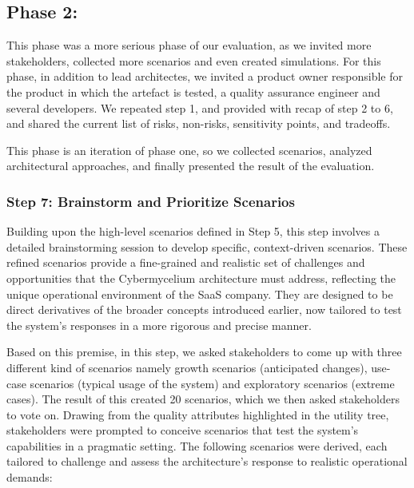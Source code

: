 \documentclass[review]{elsarticle}
\begin{document}
\subsection{Phase 2:}

This phase was a more serious phase of our evaluation, as we invited more stakeholders, collected more scenarios and even created simulations. For this phase, in addition to lead architectes, we invited a product owner responsible for the product in which the artefact is tested, a quality assurance engineer and several developers. We repeated step 1, and provided with recap of step 2 to 6, and shared the current list of risks, non-risks, sensitivity points, and tradeoffs. 

This phase is an iteration of phase one, so we collected scenarios, analyzed architectural approaches, and finally presented the result of the evaluation. 

\subsubsection{Step 7: Brainstorm and Prioritize Scenarios}

Building upon the high-level scenarios defined in Step 5, this step involves a detailed brainstorming session to develop specific, context-driven scenarios. These refined scenarios provide a fine-grained and realistic set of challenges and opportunities that the Cybermycelium architecture must address, reflecting the unique operational environment of the SaaS company. They are designed to be direct derivatives of the broader concepts introduced earlier, now tailored to test the system's responses in a more rigorous and precise manner.


Based on this premise, in this step, we asked stakeholders to come up with three different kind of scenarios namely growth scenarios (anticipated changes), use-case scenarios (typical usage of the system) and exploratory scenarios (extreme cases). The result of this created 20 scenarios, which we then asked stakeholders to vote on. Drawing from the quality attributes highlighted in the utility tree, stakeholders were prompted to conceive scenarios that test the system's capabilities in a pragmatic setting. The following scenarios were derived, each tailored to challenge and assess the architecture's response to realistic operational demands:
\end{document}

